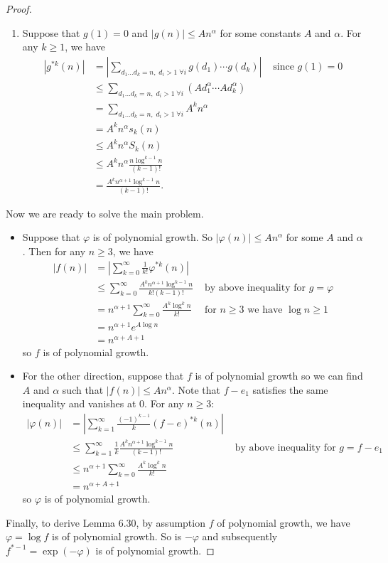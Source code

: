 \documentclass[12pt]{article}
\newcommand{\Abs}[1]{\left| #1 \right|}
\begin{document}
\begin{proof}
\begin{enumerate}
\item Suppose that $g(1) = 0$ and $|g(n)| \leq A n^\alpha$ for some constants $A$ and $\alpha$. For any $k \geq 1$, we have
\begin{align*}
\Abs{ g^{*k}(n) } &= \Abs{ \sum_{d_1 ... d_k = n, \; d_i > 1 \; \forall i} g(d_1) \cdots g(d_k) } &\text{ since } g(1) = 0\\
&\leq \sum_{d_1 ... d_k = n, \; d_i > 1 \; \forall i} (Ad_1^\alpha \cdots Ad_k^\alpha)\\
&= \sum_{d_1 ... d_k = n, \; d_i > 1 \; \forall i} A^k n^\alpha\\
&= A^k n^\alpha s_k(n)\\
&\leq A^k n^\alpha S_k(n)\\
&\leq A^k n^\alpha \frac{n \log^{k-1} n}{(k-1)!}\\
&= \frac{A^k n^{\alpha + 1} \log^{k-1} n}{(k-1)!}.
\end{align*}
\end{enumerate}

Now we are ready to solve the main problem.
\begin{itemize}
\item Suppose that $\varphi$ is of polynomial growth. So $|\varphi(n)| \leq A n^\alpha$ for some $A$ and $\alpha$. Then for any $n \geq 3$, we have
\begin{align*}
\Abs{ f(n) } &= \Abs{ \sum_{k = 0}^{\infty} \frac{1}{k!} \varphi^{*k}(n) }\\
&\leq \sum_{k = 0}^{\infty} \frac{A^k n^{\alpha + 1} \log^{k-1} n}{k! (k-1)!} &\text{ by above inequality for } g = \varphi\\
&= n^{\alpha + 1} \sum_{k = 0}^{\infty} \frac{A^k \log^k n}{k!} &\text{ for } n \geq 3 \text{ we have } \log n \geq 1\\
&= n^{\alpha + 1} e^{A \log n}\\
&= n^{\alpha + A + 1}
\end{align*}
so $f$ is of polynomial growth.

\item For the other direction, suppose that $f$ is of polynomial growth so we can find $A$ and $\alpha$ such that $|f(n)| \leq A n^{\alpha}$. Note that $f - e_1$ satisfies the same inequality and vanishes at 0. For any $n \geq 3$:
\begin{align*}
\Abs{\varphi(n)} &= \Abs{ \sum_{k = 1}^{\infty} \frac{(-1)^{k-1}}{k} (f - e)^{*k} (n)}\\
&\leq \sum_{k = 1}^{\infty} \frac{1}{k} \frac{A^k n^{\alpha + 1} \log^{k-1} n}{(k-1)!} &\text{ by above inequality for } g = f - e_1\\
&\leq n^{\alpha + 1} \sum_{k = 0}^{\infty} \frac{A^k \log^k n}{k!}\\
&= n^{\alpha + A + 1}
\end{align*}
so $\varphi$ is of polynomial growth.
\end{itemize}

Finally, to derive Lemma 6.30, by assumption $f$ of polynomial growth, we have $\varphi = \log f$ is of polynomial growth. So is $-\varphi$ and subsequently $f^{*-1} = \exp(-\varphi)$ is of polynomial growth.
\end{proof}

\unless\ifdefined\IsMainDocument
\end{document}
